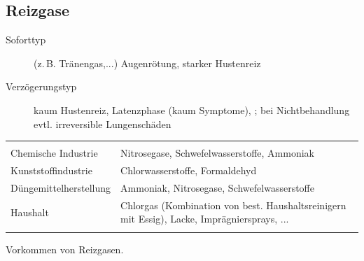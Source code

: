 


\subsection{Reizgase}

{%
\begin{description}
  \item[Soforttyp] (z.\,B. Tränengas,...) Augenrötung, starker Hustenreiz
  \item[Verzögerungstyp]  kaum
  Hustenreiz, Latenzphase (kaum Symptome),
  ;
  bei Nichtbehandlung evtl. irreversible Lungenschäden
\end{description}
}{

}{}{}{}

{}{}{%
\begin{tabulary}{\linewidth}{LL}\addlinespace\toprule\addlinespace
\noindent{} & \noindent{}
\\\addlinespace\midrule\addlinespace
Chemische Industrie 
&
Nitrosegase,  Schwefelwasserstoffe, Ammoniak
\\\addlinespace
Kunststoffindustrie 
&
Chlorwasserstoffe,  Formaldehyd
\\\addlinespace
Düngemittelherstellung 
&
Ammoniak,  Nitrosegase, Schwefelwasserstoffe
\\\addlinespace
Haushalt 
&
Chlorgas (Kombination von best.  Haushaltsreinigern mit
Essig), Lacke,  Imprägniersprays, ...
\\\addlinespace\bottomrule
\end{tabulary}
}{Vorkommen von Reizgasen.}{}





